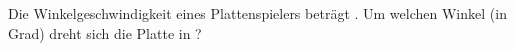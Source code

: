 Die Winkelgeschwindigkeit eines Plattenspielers beträgt \omPlO. Um welchen Winkel (in Grad) dreht sich die Platte in \tPlO?
